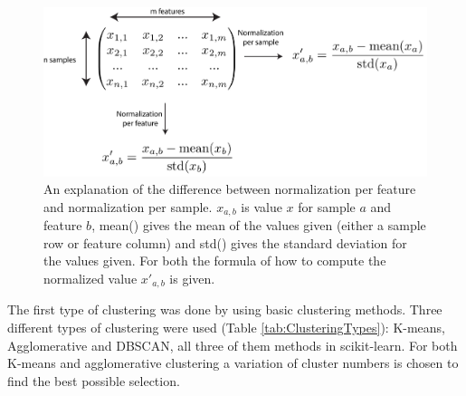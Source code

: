\documentclass[10pt,a4paper]{article}
\begin{document}
	\begin{figure}[H]
		\includegraphics[width=1\textwidth]{Normalization.png}
		\caption{An explanation of the difference between normalization per feature and normalization per sample. $x_{a,b}$ is value $x$ for sample $a$ and feature $b$, mean() gives the mean of the values given (either a sample row or feature column) and std() gives the standard deviation for the values given. For both the formula of how to compute the normalized value $x'_{a,b}$ is given.}
		\label{fig:Normalization}
	\end{figure}
	
	The first type of clustering was done by using basic clustering methods. Three different types of clustering were used (Table \ref{tab:ClusteringTypes}): K-means, Agglomerative and DBSCAN, all three of them methods in scikit-learn. For both K-means and agglomerative clustering a variation of cluster numbers is chosen to find the best possible selection.
	
\end{document}
